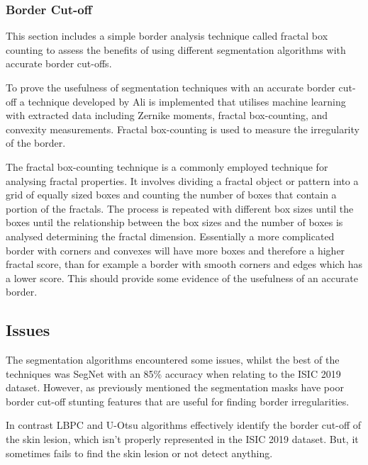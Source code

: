 
\subsubsection{Border Cut-off}
This section includes a simple border analysis technique called fractal box counting to assess the benefits of using different segmentation algorithms with accurate border cut-offs.

To prove the usefulness of segmentation techniques with an accurate border cut-off a technique developed by Ali\cite{Ali2020b} is implemented that utilises machine learning with extracted data including Zernike moments, fractal box-counting, and convexity measurements. Fractal box-counting is used to measure the irregularity of the border.

The fractal box-counting technique is a commonly employed technique for analysing fractal properties. It involves dividing a fractal object or pattern into a grid of equally sized boxes and counting the number of boxes that contain a portion of the fractals. The process is repeated with different box sizes until the boxes until the relationship between the box sizes and the number of boxes is analysed determining the fractal dimension\cite{Hamburger1996}. Essentially a more complicated border with corners and convexes will have more boxes and therefore a higher fractal score, than for example a border with smooth corners and edges which has a lower score. This should provide some evidence of the usefulness of an accurate border.

\subsection{Issues}
The segmentation algorithms encountered some issues, whilst the best of the techniques was SegNet with an 85\% accuracy when relating to the ISIC 2019 dataset. However, as previously mentioned the segmentation masks have poor border cut-off stunting features that are useful for finding border irregularities. 

In contrast LBPC and U-Otsu algorithms effectively identify the border cut-off of the skin lesion, which isn't properly represented in the ISIC 2019 dataset. But, it sometimes fails to find the skin lesion or not detect anything. 

